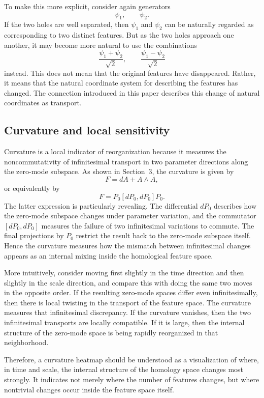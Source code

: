\documentclass[pdflatex,sn-mathphys-num]{sn-jnl}%
\theoremstyle{thmstyleone}%
\theoremstyle{thmstyletwo}%
\theoremstyle{thmstylethree}%
\begin{document}
To make this more explicit, consider again generators
\[
\psi_1,\qquad \psi_2.
\]
If the two holes are well separated, then \(\psi_1\) and \(\psi_2\) can be naturally regarded as corresponding to two distinct features. But as the two holes approach one another, it may become more natural to use the combinations
\[
\frac{\psi_1+\psi_2}{\sqrt2},\qquad \frac{\psi_1-\psi_2}{\sqrt2}
\]
instead. This does not mean that the original features have disappeared. Rather, it means that the natural coordinate system for describing the features has changed. The connection introduced in this paper describes this change of natural coordinates as transport.

\subsection{Curvature and local sensitivity}

Curvature is a local indicator of reorganization because it measures the noncommutativity of infinitesimal transport in two parameter directions along the zero-mode subspace. As shown in Section~3, the curvature is given by
\[
F=dA+A\wedge A,
\]
or equivalently by
\[
F=P_0[dP_0,dP_0]P_0.
\]
The latter expression is particularly revealing. The differential \(dP_0\) describes how the zero-mode subspace changes under parameter variation, and the commutator \([dP_0,dP_0]\) measures the failure of two infinitesimal variations to commute. The final projections by \(P_0\) restrict the result back to the zero-mode subspace itself. Hence the curvature measures how the mismatch between infinitesimal changes appears as an internal mixing inside the homological feature space.

More intuitively, consider moving first slightly in the time direction and then slightly in the scale direction, and compare this with doing the same two moves in the opposite order. If the resulting zero-mode spaces differ even infinitesimally, then there is local twisting in the transport of the feature space. The curvature measures that infinitesimal discrepancy. If the curvature vanishes, then the two infinitesimal transports are locally compatible. If it is large, then the internal structure of the zero-mode space is being rapidly reorganized in that neighborhood.

Therefore, a curvature heatmap should be understood as a visualization of where, in time and scale, the internal structure of the homology space changes most strongly. It indicates not merely where the number of features changes, but where nontrivial changes occur inside the feature space itself.
\end{document}
